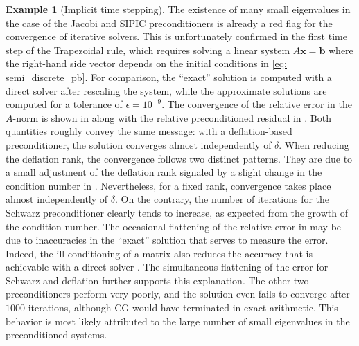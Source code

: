 \documentclass{article}
\numberwithin{equation}{section}
\theoremstyle{definition}
\newtheorem{example}[definition]{Example}
\begin{document}
\begin{example}[Implicit time stepping]
The existence of many small eigenvalues in the case of the Jacobi and SIPIC preconditioners is already a red flag for the convergence of iterative solvers. This is unfortunately confirmed in the first time step of the Trapezoidal rule, which requires solving a linear system $A\bm{x}=\bm{b}$ where the right-hand side vector depends on the initial conditions in \eqref{eq: semi_discrete_pb}. For comparison, the ``exact'' solution is computed with a direct solver after rescaling the system, while the approximate solutions are computed for a tolerance of $\epsilon=10^{-9}$. The convergence of the relative error in the $A$-norm is shown in  along with the relative preconditioned residual in . Both quantities roughly convey the same message: with a deflation-based preconditioner, the solution converges almost independently of $\delta$. When reducing the deflation rank, the convergence follows two distinct patterns. They are due to a small adjustment of the deflation rank signaled by a slight change in the condition number in . Nevertheless, for a fixed rank, convergence takes place almost independently of $\delta$. On the contrary, the number of iterations for the Schwarz preconditioner clearly tends to increase, as expected from the growth of the condition number. The occasional flattening of the relative error in  may be due to inaccuracies in the ``exact'' solution that serves to measure the error. Indeed, the ill-conditioning of a matrix also reduces the accuracy that is achievable with a direct solver \cite{higham2002accuracy}. The simultaneous flattening of the error for Schwarz and deflation further supports this explanation. The other two preconditioners perform very poorly, and the solution even fails to converge after $1000$ iterations, although CG would have terminated in exact arithmetic. This behavior is most likely attributed to the large number of small eigenvalues in the preconditioned systems.


\end{example}
\end{document}
